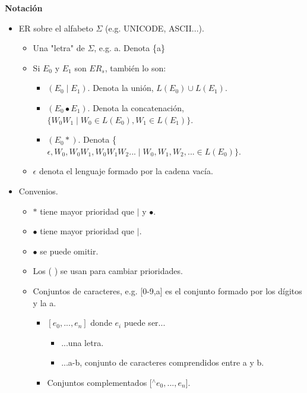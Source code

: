 \documentclass[\main/ApuntesPL.tex]{subfiles}
\begin{document}
      \newpage
      \par
      \textbf{\large Notación}
      \begin{itemize}
        \item ER sobre el alfabeto $\Sigma$ (e.g. UNICODE, ASCII...).
              \begin{itemize}
                \item Una "letra" de $\Sigma$, e.g. a. Denota \{a\}
                \item Si $E_0$ y $E_1$ son $ER_s$, también lo son:
                  \begin{itemize}
                    \item $(E_0 \mid E_1)$. Denota la unión, $L(E_0) \cup L(E_1).$
                    \item $(E_0 \bullet E_1)$. Denota la concatenación, $ \{W_0 W_1 \mid W_0 \in  L(E_0), W_1 \in L(E_1)\}$.
                    \item $(E_0 \ast)$. Denota \{$\epsilon, W_0, W_0 W_1, W_0 W_1 W_2 ...\mid W_0, W_1, W_2, ... \in L(E_0)\}$.
                  \end{itemize}
                \item $\epsilon$ denota el lenguaje formado por la cadena vacía.
              \end{itemize}
        \item Convenios.
              \begin{itemize}
                \item $\ast$ tiene mayor prioridad que $\mid$ y $\bullet$.
                \item $\bullet$ tiene mayor prioridad que $\mid$.
                \item $\bullet$ se puede omitir.
                \item Los ( ) se usan para cambiar prioridades.
                \item Conjuntos de caracteres, e.g. [0-9,a] es el conjunto formado por los dígitos y la a.
                  \begin{itemize}
                    \item $[e_0, ..., e_n]$ donde $e_i$ puede ser...
                      \begin{itemize}
                        \item ...una letra.
                        \item ...a-b, conjunto de caracteres comprendidos entre a y b.
                      \end{itemize}
                    \item Conjuntos complementados [$^\wedge e_0, ..., e_n$].

\end{itemize}
\end{itemize}
\end{itemize}
\end{document}
